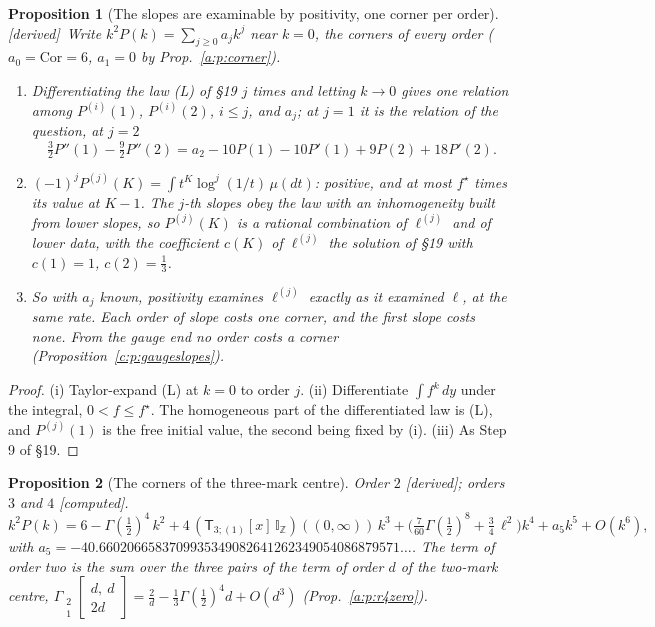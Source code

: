 \documentclass[11pt]{article}
\newcommand{\sT}{\mathsf T}
\newcommand{\Gst}[4]{\Gamma_{\substack{#1\\#2}}\!\begin{bmatrix}#3\\#4\end{bmatrix}}
\newcommand{\IZ}{\mathbb I_{\mathbb Z}}
\newcommand{\Tx}[3]{(\sT_{#1;(1)}[x]\,#2)((#3,\infty))}
\theoremstyle{plain}
\newtheorem{proposition}{Proposition}[section]
\theoremstyle{definition}
\theoremstyle{remark}
\newcommand{\derived}{\textup{[derived]}}
\newcommand{\computed}{\textup{[computed]}}
\begin{document}
\begin{proposition}[The slopes are examinable by positivity, one corner per order]\label{b:p:slopes}\derived\
Write $k^2P(k)=\sum_{j\ge0}a_jk^j$ near $k=0$, the corners of every order ($a_0=\mathrm{Cor}=6$, $a_1=0$ by Prop.~\ref{a:p:corner}).
\begin{enumerate}[label=(\roman*)]
\item Differentiating the law (L) of \S19 $j$ times and letting $k\to0$ gives one relation among $P^{(i)}(1)$, $P^{(i)}(2)$, $i\le j$, and $a_j$; at $j=1$ it is the relation of the question, at $j=2$
\[
\tfrac32P''(1)-\tfrac92P''(2)=a_2-10P(1)-10P'(1)+9P(2)+18P'(2).
\]
\item $(-1)^jP^{(j)}(K)=\int t^K\log^j(1/t)\,\mu(dt)$: positive, and at most $f^\star$ times its value at $K-1$. The $j$-th slopes obey the law with an inhomogeneity built from lower slopes, so $P^{(j)}(K)$ is a rational combination of $\ell^{(j)}$ and of lower data, with the coefficient $c(K)$ of $\ell^{(j)}$ the solution of \S19 with $c(1)=1$, $c(2)=\frac13$.
\item So with $a_j$ known, positivity examines $\ell^{(j)}$ exactly as it examined $\ell$, at the same rate. Each order of slope costs one corner, and the first slope costs none. From the gauge end no order costs a corner (Proposition~\ref{c:p:gaugeslopes}).
\end{enumerate}
\end{proposition}

\begin{proof}
(i) Taylor-expand (L) at $k=0$ to order $j$. (ii) Differentiate $\int f^k\,dy$ under the integral, $0<f\le f^\star$. The homogeneous part of the differentiated law is (L), and $P^{(j)}(1)$ is the free initial value, the second being fixed by (i). (iii) As Step 9 of \S19.
\end{proof}

\begin{proposition}[The corners of the three-mark centre]\label{b:p:corners3}Order $2$ \derived; orders $3$ and $4$ \computed.\
\[
k^2P(k)=6-\Gamma(\tfrac12)^4\,k^2+4\,\Tx3{\IZ}0\,k^3+\Big(\tfrac7{60}\Gamma(\tfrac12)^8+\tfrac34\,\ell^2\Big)k^4+a_5k^5+O(k^6),
\]
with $a_5=-40.6602066583709935349082641262349054086879571\ldots$. The term of order two is the sum over the three pairs of the term of order $d$ of the two-mark centre, $\Gst21{d,\ d}{2d}=\frac2d-\frac13\Gamma(\frac12)^4d+O(d^3)$ (Prop.~\ref{a:p:r4zero}).
\end{proposition}
\end{document}
